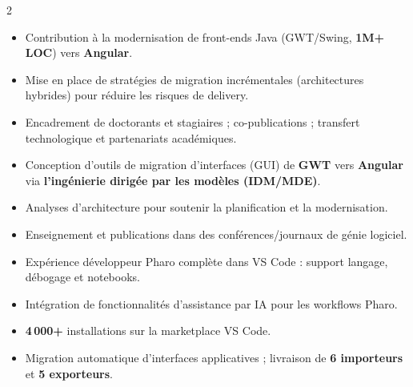 \documentclass[10pt,a4paper,ragged2e,withhyper]{altacv}
\begin{document}
\begin{paracol}{2}
\divider

\begin{itemize}
  \item Contribution à la modernisation de front-ends Java (GWT/Swing, \textbf{1M+ LOC}) vers \textbf{Angular}.
  \item Mise en place de stratégies de migration incrémentales (architectures hybrides) pour réduire les risques de delivery.
  \item Encadrement de doctorants et stagiaires ; co-publications ; transfert technologique et partenariats académiques.
\end{itemize}

\divider

\begin{itemize}
  \item Conception d’outils de migration d’interfaces (GUI) de \textbf{GWT} vers \textbf{Angular} via \textbf{l’ingénierie dirigée par les modèles (IDM/MDE)}.
  \item Analyses d’architecture pour soutenir la planification et la modernisation.
  \item Enseignement et publications dans des conférences/journaux de génie logiciel.
\end{itemize}


\begin{itemize}
  \item Expérience développeur Pharo complète dans VS Code : support langage, débogage et notebooks.
  \item Intégration de fonctionnalités d’assistance par IA pour les workflows Pharo.
  \item \textbf{4\,000+} installations sur la marketplace VS Code.
\end{itemize}

\divider

\begin{itemize}
  \item Migration automatique d’interfaces applicatives ; livraison de \textbf{6 importeurs} et \textbf{5 exporteurs}.
\end{itemize}


\end{paracol}
\end{document}
